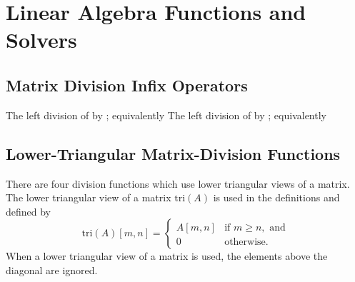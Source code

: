 \section{Linear Algebra Functions and Solvers}

\subsection{Matrix Division Infix Operators}
%
\begin{description}
%
%
%
The left division of  by ; equivalently
%
The left division of  by ; equivalently
%
\end{description}

\subsection{Lower-Triangular Matrix-Division Functions}

There are four division functions which use lower triangular views of
a matrix.  The lower triangular view of a matrix $\mbox{tri}(A)$ is
used in the definitions and defined by
\[
\mbox{tri}(A)[m,n] = 
\left\{
\begin{array}{ll}
A[m,n] & \mbox{if } m \geq n, \mbox{ and}
\\[4pt]
0 & \mbox{otherwise}.
\end{array}
\right.
\]
When a lower triangular view of a matrix is used, the elements above
the diagonal are ignored.

